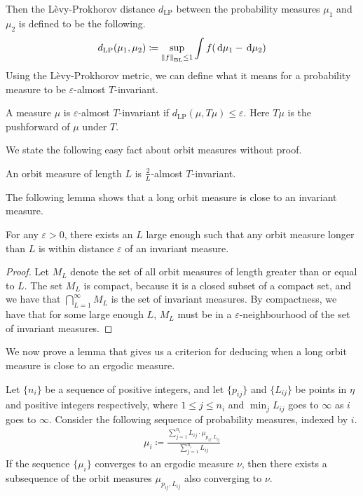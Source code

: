 \documentclass[12pt, reqno]{amsart}
\begin{document}
Then the Lèvy-Prokhorov distance $d_{\mathrm{LP}}$ between the probability measures $\mu_1$ and $\mu_2$ is defined to be the following.
\begin{align*}
  d_{\mathrm{LP}}(\mu_1, \mu_2) \coloneqq \sup_{\left\lVert f\right\rVert_{\mathrm{BL}} \leq 1} \int f (\mathrm{\,d} \mu_1 - \mathrm{\,d} \mu_2)
\end{align*}
Using the Lèvy-Prokhorov metric, we can define what it means for a probability measure to be $\varepsilon$-almost $T$-invariant.
\begin{definition}
  A measure $\mu$ is $\varepsilon$-almost $T$-invariant if $d_{\mathrm{LP}}(\mu, T \mu) \leq \varepsilon$. Here $T \mu$ is the pushforward of $\mu$ under $T$.
\end{definition}
We state the following easy fact about orbit measures without proof.
\begin{fact}
  An orbit measure of length $L$ is $\frac{2}{L}$-almost $T$-invariant.
\end{fact}
The following lemma shows that a long orbit measure is close to an invariant measure.
\begin{lemma}
  \label{lem:long-orbit-is-almost-invariant}
  For any $\varepsilon > 0$, there exists an $L$ large enough such that any orbit measure longer than $L$ is within distance $\varepsilon$ of an invariant measure.
\end{lemma}
\begin{proof}
  Let $M_L$ denote the set of all orbit measures of length greater than or equal to $L$.
  The set $M_L$ is compact, because it is a closed subset of a compact set, and we have that $\bigcap_{L=1}^{\infty} M_L$ is the set of invariant measures.
  By compactness, we have that for some large enough $L$, $M_L$ must be in a $\varepsilon$-neighbourhood of the set of invariant measures.
\end{proof}
We now prove a lemma that gives us a criterion for deducing when a long orbit measure is close to an ergodic measure.
\begin{lemma}
  \label{lem:convexity-argument}
  Let $\{n_i\}$ be a sequence of positive integers, and let $\{p_{ij}\}$ and $\{L_{ij}\}$ be points in $\eta$ and positive integers respectively, where $1 \leq j \leq n_i$ and $\min_j L_{ij}$ goes to $\infty$ as $i$ goes to $\infty$.
  Consider the following sequence of probability measures, indexed by $i$.
  \begin{align*}
    \mu_i \coloneqq \frac{\sum_{j=1}^{n_i} L_{ij} \cdot \mu_{p_{ij}, L_{ij}}}{\sum_{j=1}^{n_i} L_{ij}}
  \end{align*}
  If the sequence $\{\mu_i\}$ converges to an ergodic measure $\nu$, then there exists a subsequence of the orbit measures $\mu_{p_{ij}, L_{ij}}$ also converging to $\nu$.
\end{lemma}
\end{document}
